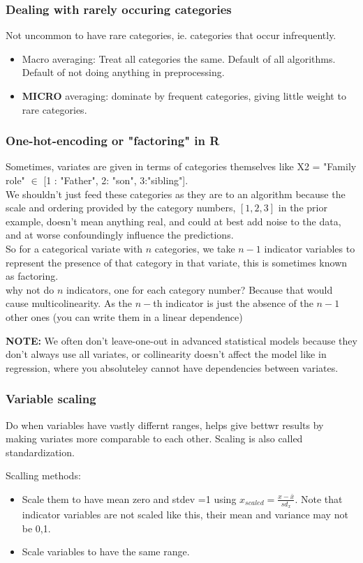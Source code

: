 \documentclass{article}
\begin{document}
\subsubsection{Dealing with rarely occuring categories}
Not uncommon to have rare categories, ie. categories that occur infrequently.
\begin{itemize}
\item Macro averaging: Treat all categories the same. Default of all algorithms. Default of not doing anything in preprocessing.
\item \textbf{MICRO} averaging: dominate by frequent categories, giving little weight to rare categories.
\end{itemize}


\subsubsection{One-hot-encoding or "factoring" in R}
Sometimes, variates are given in terms of categories themselves like X2 = "Family role" $\in$ [1 : "Father", 2: "son", 3:"sibling"]. \\

We shouldn't just feed these categories as they are to an algorithm because the scale and ordering provided by the category numbers, $[1,2,3]$ in the prior example, doesn't mean anything real, and could at best add noise to the data, and at worse confoundingly influence the predictions.\\ 

So for a categorical variate with $n$ categories, we take $n-1$ indicator variables to represent the presence of that category in that variate, this is sometimes known as factoring. \\

why not do $n$ indicators, one for each category number? Because that would cause multicolinearity. As the $n-$th indicator is just the absence of the $n-1$ other ones (you can write them in a linear dependence)

\textbf{NOTE:} We often don't leave-one-out in advanced statistical models because they don't always use all variates, or collinearity doesn't affect the model like in regression, where you absoluteley cannot have dependencies between variates.


\subsubsection{Variable scaling}
Do when variables have vastly differnt ranges, helps give bettwr results by making variates more comparable to each other. 
Scaling is also called standardization.

Scalling methods:
\begin{itemize}
\item Scale them to have mean zero and stdev =1 using $x_{scaled} = \frac{x-\bar x}{sd_x}$. Note that indicator variables are not scaled like this, their mean and variance may not be 0,1.
\item Scale variables to have the same range.
\end{itemize}
\end{document}
